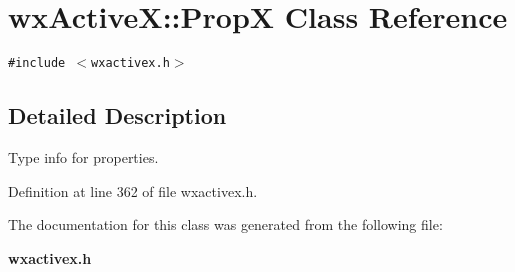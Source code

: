\section{wx\-Active\-X::Prop\-X Class Reference}
\label{classwxActiveX_1_1PropX}
{\tt \#include $<$wxactivex.h$>$}



\subsection{Detailed Description}
Type info for properties.



Definition at line 362 of file wxactivex.h.

The documentation for this class was generated from the following file:\begin{CompactItemize}
\item 
{\bf wxactivex.h}\end{CompactItemize}
